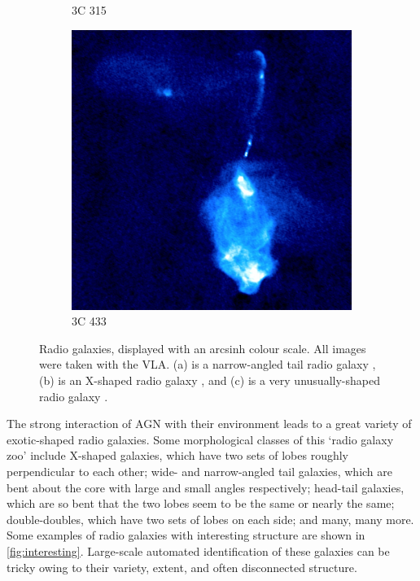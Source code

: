 \begin{figure}
\begin{subfigure}{0.3\textwidth}
                \caption{3C 315}
                \label{fig:3C315}
            \end{subfigure}
            \begin{subfigure}{0.3\textwidth}
                \includegraphics[width=\textwidth]{images/3C_433.jpg}
                \caption{3C 433}
                \label{fig:3C433}
            \end{subfigure}
            \caption[Three radio galaxies with interesting structure.]{Radio galaxies, displayed with an arcsinh colour scale. All images were taken with the VLA. (a) is a narrow-angled tail radio galaxy \citep{leahy_atlas_nodate}, (b) is an X-shaped radio galaxy \citep{leahy_polarization_1986}, and (c) is a very unusually-shaped radio galaxy \citep{black_study_1992}.}
            \label{fig:interesting}
        \end{figure}

        The strong interaction of AGN with their environment leads to a great variety of exotic-shaped radio galaxies. Some morphological classes of this `radio galaxy zoo' include X-shaped galaxies, which have two sets of lobes roughly perpendicular to each other; wide- and narrow-angled tail galaxies, which are bent about the core with large and small angles respectively; head-tail galaxies, which are so bent that the two lobes seem to be the same or nearly the same; double-doubles, which have two sets of lobes on each side; and many, many more. Some examples of radio galaxies with interesting structure are shown in \autoref{fig:interesting}. Large-scale automated identification of these galaxies can be tricky owing to their variety, extent, and often disconnected structure.

